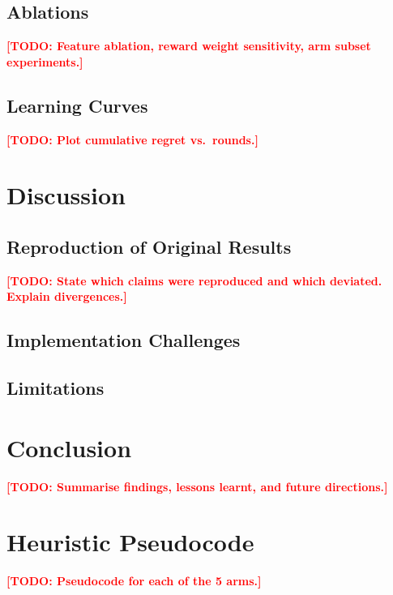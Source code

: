 \documentclass[12pt, a4paper]{article}
\newcommand{\TODO}[1]{\textbf{\textcolor{red}{[TODO: #1]}}}
\begin{document}
\subsection{Ablations}

\TODO{Feature ablation, reward weight sensitivity, arm subset experiments.}

\subsection{Learning Curves}

\TODO{Plot cumulative regret vs.\ rounds.}

\section{Discussion}
\label{sec:discussion}

\subsection{Reproduction of Original Results}

\TODO{State which claims were reproduced and which deviated. Explain divergences.}

\subsection{Implementation Challenges}

\subsection{Limitations}

\section{Conclusion}
\label{sec:conclusion}

\TODO{Summarise findings, lessons learnt, and future directions.}

\appendix

\section{Heuristic Pseudocode}
\label{app:heuristics}

\TODO{Pseudocode for each of the 5 arms.}
\end{document}
